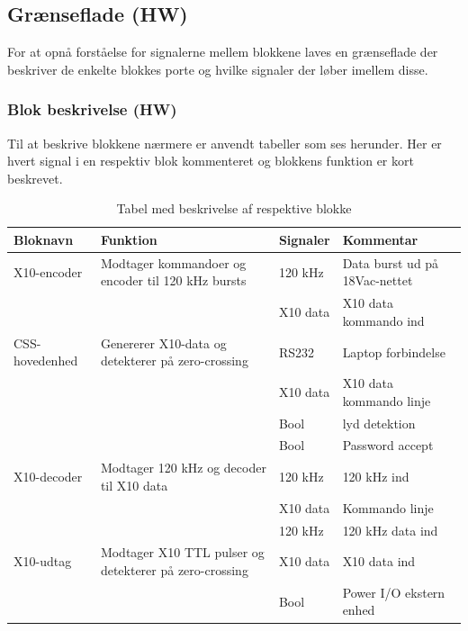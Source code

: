 \clearpage
\newpage

\begin{table}[H] %
\subsection{Grænseflade (HW)}
For at opnå forståelse for signalerne mellem blokkene laves en grænseflade der beskriver de enkelte blokkes porte og hvilke signaler der løber imellem disse.

\subsubsection{Blok beskrivelse (HW)}
Til at beskrive blokkene nærmere er anvendt tabeller som ses herunder. Her er hvert signal i en respektiv blok kommenteret og blokkens funktion er kort beskrevet. 

\caption{Tabel med beskrivelse af respektive blokke}
\begin{small}
\begin{tabular}{|p{}|p{}|p{}|p{}|}
\hline
\textbf{Bloknavn} & \textbf{Funktion} & \textbf{Signaler} & \textbf{Kommentar} \\ \hline

X10-encoder & Modtager kommandoer og encoder til 120 kHz bursts & 120 kHz & Data burst ud på 18Vac-nettet \\ \cline{3-4}	
& & X10 data & X10 data kommando ind \\ \hline

CSS-hovedenhed & Genererer X10-data og detekterer på zero-crossing & RS232 & Laptop forbindelse \\ \cline{3-4}
& & X10 data & X10 data kommando linje \\ \cline{3-4}
& & Bool & lyd detektion \\ \cline{3-4}
& & Bool & Password accept \\ \hline

X10-decoder & Modtager 120 kHz og decoder til X10 data & 120 kHz & 120 kHz ind \\ \cline{3-4}
& & X10 data & Kommando linje \\ \cline{3-4}
& & 120 kHz & 120 kHz data ind \\ \hline

X10-udtag & Modtager X10 TTL pulser og detekterer på zero-crossing & X10 data & X10 data ind \\ \cline{3-4}
&& Bool & Power I/O ekstern enhed \\ \hline 
\end{tabular}
\end{small}
\label{table:Bloktabel}
\end{table}

